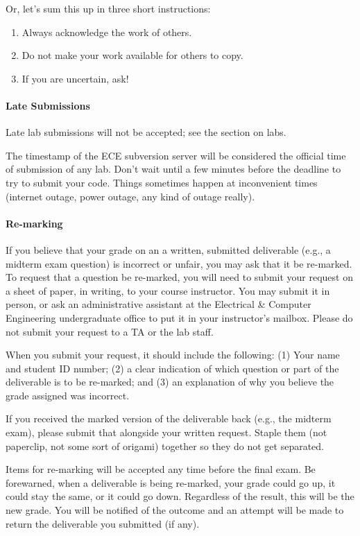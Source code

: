 \documentclass[letterpaper,10pt]{article}
\begin{document}
Or, let's sum this up in three short instructions:
\begin{enumerate}
	\item Always acknowledge the work of others. 
	\item Do not make your work available for others to copy.
	\item If you are uncertain, ask!
\end{enumerate}

\paragraph{Late Submissions} Late lab submissions will not be accepted; see the section on labs.

The timestamp of the ECE subversion server will be considered the official time of submission of any lab. Don't wait until a few minutes before the deadline to try to submit your code. Things sometimes happen at inconvenient times (internet outage, power outage, any kind of outage really).

\paragraph{Re-marking}

If you believe that your grade on an a written, submitted deliverable (e.g., a midterm exam question) is incorrect or unfair, you may ask that it be re-marked. To request that a question be re-marked, you will need to submit your request on a sheet of paper, in writing, to your course instructor. You may submit it in person, or ask an administrative assistant at the Electrical \& Computer Engineering undergraduate office to put it in your instructor's mailbox. Please do not submit your request to a TA or the lab staff. 

When you submit your request, it should include the following: (1) Your name and student ID number; (2) a clear indication of which question or part of the deliverable is to be re-marked; and (3) an explanation of why you believe the grade assigned was incorrect.

If you received the marked version of the deliverable back (e.g., the midterm exam), please submit that alongside your written request. Staple them (not paperclip, not some sort of origami) together so they do not get separated.

Items for re-marking will be accepted any time before the final exam. Be forewarned, when a deliverable is being re-marked, your grade could go up, it could stay the same, or it could go down. Regardless of the result, this will be the new grade. You will be notified of the outcome and an attempt will be made to return the deliverable you submitted (if any).
\end{document}
